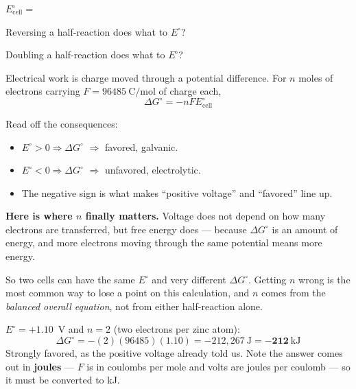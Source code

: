 \documentclass{apchem-notes}
\begin{document}

\begin{warmup}[3]
  \item $E^\circ_{\text{cell}} = $
  \item Reversing a half-reaction does what to $E^\circ$?
  \item Doubling a half-reaction does what to $E^\circ$?
\end{warmup}



Electrical work is charge moved through a potential difference. For $n$
moles of electrons carrying 
$F = \SI{96485}{\coulomb\per\mole}$ of charge each,
\[ \boxed{\;\Delta G^\circ = -nFE^\circ_{\text{cell}}\;} \]

Read off the consequences:

\begin{itemize}[leftmargin=*,itemsep=0.3em]
  \item $E^\circ > 0 \Rightarrow \Delta G^\circ$
         $\Rightarrow$ favored, galvanic.
  \item $E^\circ < 0 \Rightarrow \Delta G^\circ$
         $\Rightarrow$ unfavored, electrolytic.
  \item The negative sign is what makes ``positive voltage'' and
        ``favored'' line up.
\end{itemize}

\begin{apctrap}
\textbf{Here is where $n$ finally matters.} Voltage does not depend on how
many electrons are transferred, but free energy does --- because
$\Delta G^\circ$ is an amount of energy, and more electrons moving through
the same potential means more energy.

So two cells can have the same $E^\circ$ and very different
$\Delta G^\circ$. Getting $n$ wrong is the most common way to lose a point
on this calculation, and $n$ comes from the \emph{balanced overall
equation}, not from either half-reaction alone.
\end{apctrap}

\begin{workedexample}
$E^\circ = +1.10$~V and $n = 2$ (two electrons per zinc atom):
\[ \Delta G^\circ = -(2)(96485)(1.10) = -212{,}267~\text{J}
   = \mathbf{-212}~\text{kJ} \]
Strongly favored, as the positive voltage already told us. Note the answer
comes out in \textbf{joules} --- $F$ is in coulombs per mole and volts are
joules per coulomb --- so it must be converted to kJ.
\end{workedexample}
\end{document}
